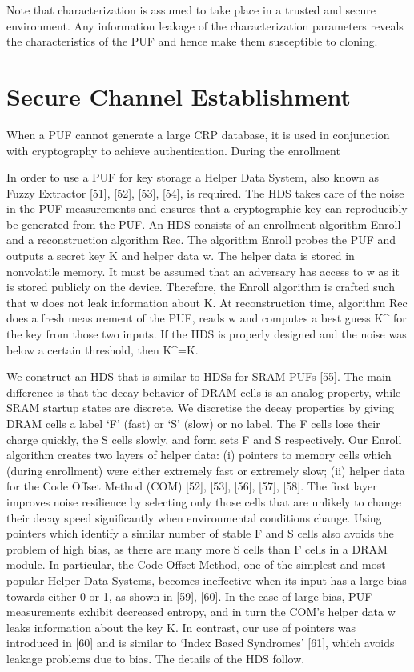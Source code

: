 \documentclass[journal, a4paper]{IEEEtran}
\begin{document}
Note that characterization is assumed to take place in a trusted and secure environment. Any information leakage of the characterization parameters reveals the characteristics of the PUF and hence make them susceptible to cloning.

\section{Secure Channel Establishment}

When a PUF cannot generate a large CRP database, it is used in conjunction with cryptography to achieve authentication. During the enrollment 

In order to use a PUF for key storage a Helper Data System, also known as Fuzzy Extractor [51], [52], [53], [54], is required. The HDS takes care of the noise in the PUF measurements and ensures that a cryptographic key can reproducibly be generated from the PUF. An HDS consists of an enrollment algorithm Enroll and a reconstruction algorithm Rec. The algorithm Enroll probes the PUF and outputs a secret key K and helper data w. The helper data is stored in nonvolatile memory. It must be assumed that an adversary has access to w as it is stored publicly on the device. Therefore, the Enroll algorithm is crafted such that w does not leak information about K. At reconstruction time, algorithm Rec does a fresh measurement of the PUF, reads w and computes a best guess K^ for the key from those two inputs. If the HDS is properly designed and the noise was below a certain threshold, then K^=K.

We construct an HDS that is similar to HDSs for SRAM PUFs [55]. The main difference is that the decay behavior of DRAM cells is an analog property, while SRAM startup states are discrete. We discretise the decay properties by giving DRAM cells a label ‘F’ (fast) or ‘S’ (slow) or no label. The F cells lose their charge quickly, the S cells slowly, and form sets F and S respectively. Our Enroll algorithm creates two layers of helper data: (i) pointers to memory cells which (during enrollment) were either extremely fast or extremely slow; (ii) helper data for the Code Offset Method (COM) [52], [53], [56], [57], [58]. The first layer improves noise resilience by selecting only those cells that are unlikely to change their decay speed significantly when environmental conditions change. Using pointers which identify a similar number of stable F and S cells also avoids the problem of high bias, as there are many more S cells than F cells in a DRAM module. In particular, the Code Offset Method, one of the simplest and most popular Helper Data Systems, becomes ineffective when its input has a large bias towards either 0 or 1, as shown in [59], [60]. In the case of large bias, PUF measurements exhibit decreased entropy, and in turn the COM's helper data w leaks information about the key K. In contrast, our use of pointers was introduced in [60] and is similar to ‘Index Based Syndromes’ [61], which avoids leakage problems due to bias. The details of the HDS follow.
\end{document}
